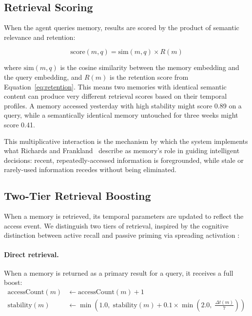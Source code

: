 \documentclass[11pt,a4paper]{article}
\begin{document}
\subsection{Retrieval Scoring}

When the agent queries memory, results are scored by the product of semantic relevance and retention:

\begin{equation}
\text{score}(m, q) = \text{sim}(m, q) \times R(m)
\label{eq:score}
\end{equation}

\noindent where $\text{sim}(m, q)$ is the cosine similarity between the memory embedding and the query embedding, and $R(m)$ is the retention score from Equation~\ref{eq:retention}. This means two memories with identical semantic content can produce very different retrieval scores based on their temporal profiles. A memory accessed yesterday with high stability might score 0.89 on a query, while a semantically identical memory untouched for three weeks might score 0.41.

This multiplicative interaction is the mechanism by which the system implements what Richards and Frankland~\citeyearpar{richards2017persistence} describe as memory's role in guiding intelligent decisions: recent, repeatedly-accessed information is foregrounded, while stale or rarely-used information recedes without being eliminated.

\subsection{Two-Tier Retrieval Boosting}
\label{sec:boost}

When a memory is retrieved, its temporal parameters are updated to reflect the access event. We distinguish two tiers of retrieval, inspired by the cognitive distinction between active recall and passive priming via spreading activation \citep{collins1975spreading}:

\paragraph{Direct retrieval.} When a memory is returned as a primary result for a query, it receives a full boost:
\begin{align}
\text{accessCount}(m) &\leftarrow \text{accessCount}(m) + 1 \\
\text{stability}(m) &\leftarrow \min\!\left(1.0,\; \text{stability}(m) + 0.1 \times \min\!\left(2.0,\; \frac{\Delta t(m)}{7}\right)\right)
\end{align}
\end{document}
